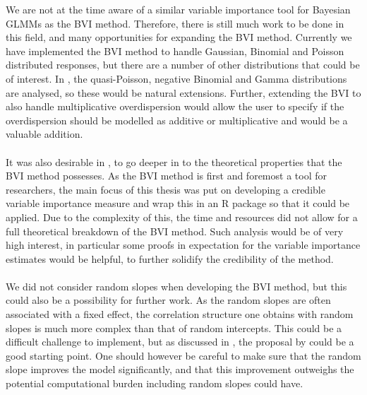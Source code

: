 We are not at the time aware of a similar variable importance tool for Bayesian GLMMs as the BVI method. Therefore, there is still much work to be done in this field, and many opportunities for expanding the BVI method. Currently we have implemented the BVI method to handle Gaussian, Binomial and Poisson distributed responses, but there are a number of other distributions that could be of interest. In \citet{nakagawa2017}, the quasi-Poisson, negative Binomial and Gamma distributions are analysed, so these would be natural extensions. Further, extending the BVI to also handle multiplicative overdispersion would allow the user to specify if the overdispersion should be modelled as additive or multiplicative and would be a valuable addition.
\\
\\
It was also desirable in \citet{Arnstad:Relative_variable_importance_in_Bayesian_linear_mixed_models:2024}, to go deeper in to the theoretical properties that the BVI method possesses. As the BVI method is first and foremost a tool for researchers, the main focus of this thesis was put on developing a credible variable importance measure and wrap this in an R package so that it could be applied. Due to the complexity of this, the time and resources did not allow for a full theoretical breakdown of the BVI method. Such analysis would be of very high interest, in particular some proofs in expectation for the variable importance estimates would be helpful, to further solidify the credibility of the method. 
\\
\\
We did not consider random slopes when developing the BVI method, but this could also be a possibility for further work. As the random slopes are often associated with a fixed effect, the correlation structure one obtains with random slopes is much more complex than that of random intercepts. This could be a difficult challenge to implement, but as discussed in , the proposal by \citet{Johnson2014} could be a good starting point. One should however be careful to make sure that the random slope improves the model significantly, and that this improvement outweighs the potential computational burden including random slopes could have.
\\
\\
